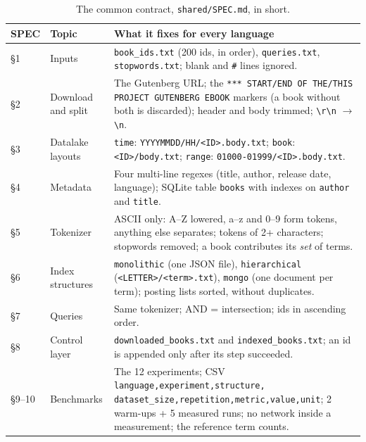 \documentclass[11pt,a4paper]{article}
\newcommand{\code}[1]{\texttt{#1}}
\begin{document}
\begin{table}[H]
\centering\small
\begin{tabularx}{\linewidth}{@{}L{1.3cm} L{2.9cm} Y@{}}
\toprule
SPEC & Topic & What it fixes for every language \\
\midrule
\S1 & Inputs & \code{book\_ids.txt} (200 ids, in order), \code{queries.txt}, \code{stopwords.txt}; blank and \code{\#} lines ignored. \\
\S2 & Download and split & The Gutenberg URL; the \code{*** START/END OF THE/THIS PROJECT GUTENBERG EBOOK} markers (a book without both is discarded); header and body trimmed; \code{\textbackslash r\textbackslash n} $\rightarrow$ \code{\textbackslash n}. \\
\S3 & Datalake layouts & \code{time}: \code{YYYYMMDD/HH/<ID>.body.txt}; \code{book}: \code{<ID>/body.txt}; \code{range}: \code{01000-01999/<ID>.body.txt}. \\
\S4 & Metadata & Four multi-line regexes (title, author, release date, language); SQLite table \code{books} with indexes on \code{author} and \code{title}. \\
\S5 & Tokenizer & ASCII only: A--Z lowered, a--z and 0--9 form tokens, anything else separates; tokens of 2+ characters; stopwords removed; a book contributes its \emph{set} of terms. \\
\S6 & Index structures & \code{monolithic} (one JSON file), \code{hierarchical} (\code{<LETTER>/<term>.txt}), \code{mongo} (one document per term); posting lists sorted, without duplicates. \\
\S7 & Queries & Same tokenizer; AND = intersection; ids in ascending order. \\
\S8 & Control layer & \code{downloaded\_books.txt} and \code{indexed\_books.txt}; an id is appended only after its step succeeded. \\
\S9--10 & Benchmarks & The 12 experiments; CSV \code{language,experiment,structure,} \code{dataset\_size,repetition,metric,value,unit}; 2 warm-ups + 5 measured runs; no network inside a measurement; the reference term counts. \\
\bottomrule
\end{tabularx}
\caption{The common contract, \code{shared/SPEC.md}, in short.}
\label{tab:spec}
\end{table}
\end{document}
